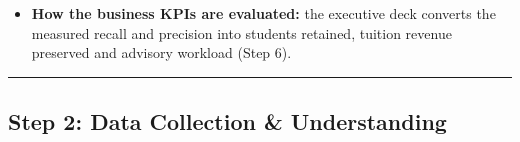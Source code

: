 \documentclass[11pt]{article}
\providecommand{\tightlist}{%
      \setlength{\itemsep}{0pt}\setlength{\parskip}{0pt}}
\begin{document}
\begin{itemize}
\tightlist
\item
  \textbf{How the business KPIs are evaluated:} the executive deck
  converts the measured recall and precision into students retained,
  tuition revenue preserved and advisory workload (Step 6).
\end{itemize}

    \begin{center}\rule{0.5\linewidth}{0.5pt}\end{center}

\hypertarget{step-2-data-collection-understanding}{%
\subsection{Step 2: Data Collection \&
Understanding}\label{step-2-data-collection-understanding}}
\end{document}
